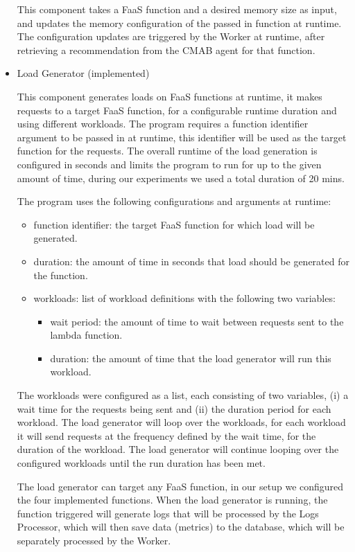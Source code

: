 \documentclass[conference]{IEEEtran}
\begin{document}
\begin{itemize}
This component takes a FaaS function and a desired memory size as input, and updates the memory configuration of the passed in function at runtime. The configuration updates are triggered by the Worker at runtime, after retrieving a recommendation from the CMAB agent for that function.

\item Load Generator (implemented)

This component generates loads on FaaS functions at runtime, it makes requests to a target FaaS function, for a configurable runtime duration and using different workloads. The program requires a function identifier argument to be passed in at runtime, this identifier will be used as the target function for the requests. The overall runtime of the load generation is configured in seconds and limits the program to run for up to the given amount of time, during our experiments we used a total duration of 20 mins.

The program uses the following configurations and arguments at runtime:
\begin{itemize}
    \item function identifier: the target FaaS function for which load will be generated.
    \item duration: the amount of time in seconds that load should be generated for the function.
    \item workloads: list of workload definitions with the following two variables:
        \begin{itemize}
            \item wait period: the amount of time to wait between requests sent to the lambda function.
            \item duration: the amount of time that the load generator will run this workload.
        \end{itemize}
\end{itemize}

The workloads were configured as a list, each consisting of two variables, (i) a wait time for the requests being sent and (ii) the duration period for each workload. The load generator will loop over the workloads, for each workload it will send requests at the frequency defined by the wait time, for the duration of the workload. The load generator will continue looping over the configured workloads until the run duration has been met.

The load generator can target any FaaS function, in our setup we configured the four implemented functions. When the load generator is running, the function triggered will generate logs that will be processed by the Logs Processor, which will then save data (metrics) to the database, which will be separately processed by the Worker.


\end{itemize}
\end{document}
